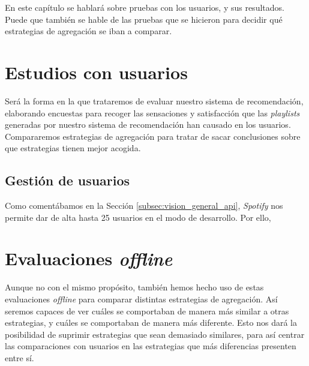 En este capítulo se hablará sobre pruebas con los usuarios, y sus resultados. Puede que también
se hable de las pruebas que se hicieron para decidir qué estrategias de
agregación se iban a comparar.

\section{Estudios con usuarios\label{SEC:ESTUDIOS_USUARIOS}}

Será la forma en la que trataremos de evaluar nuestro sistema de recomendación, elaborando encuestas para recoger las sensaciones y satisfacción
que las \textit{playlists} generadas por nuestro sistema de recomendación han causado en los usuarios. Compararemos estrategias de agregación para tratar de sacar conclusiones
sobre que estrategias tienen mejor acogida.

\subsection{Gestión de usuarios\label{SEC:GESTION_USUARIOS}}

Como comentábamos en la Sección \ref{subsec:vision_general_api}, \textit{Spotify} nos permite dar de alta hasta 25 usuarios en el modo de desarrollo. Por ello, 

\section{Evaluaciones \textit{offline}\label{SEC:EVALUACIONES_OFFLINE}}

Aunque no con el mismo propósito, también hemos hecho uso de estas evaluaciones \textit{offline} para comparar distintas estrategias de agregación. Así seremos
capaces de ver cuáles se comportaban de manera más similar a otras estrategias, y cuáles se comportaban de manera más diferente. Esto nos dará la posibilidad de suprimir
estrategias que sean demasiado similares, para así centrar las comparaciones con usuarios en las estrategias que más diferencias presenten entre sí.
